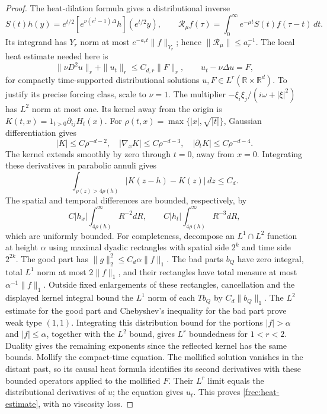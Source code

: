 \begin{proof}
The heat-dilation formula gives a distributional inverse
\[
 S(t)h(y)=e^{t/2}[e^{\nu(e^t-1)\Delta}h](e^{t/2}y),\qquad
 \mathcal R_\mu f(\tau)=\int_0^\infty e^{-\mu t}S(t)f(\tau-t)\,dt.
\]
Its integrand has \(Y_r\) norm at most
\(e^{-a_rt}\|f\|_{Y_r}\); hence \(\|\mathcal R_\mu\|\le a_r^{-1}\).
The local heat estimate needed here is
\begin{equation}\label{free:heat-estimate}
 \|\nu D^2u\|_r+\|u_t\|_r\le C_{d,r}\|F\|_r,\qquad
 u_t-\nu\Delta u=F,
\end{equation}
for compactly time-supported distributional solutions \(u,F\in
L^r(\mathbb R\times\mathbb R^d)\). To justify its precise forcing
class, scale to \(\nu=1\). The multiplier
\(-\xi_i\xi_j/(i\omega+|\xi|^2)\) has \(L^2\) norm at most one.
Its kernel away from the origin is
\(K(t,x)=1_{t>0}\partial_{ij}H_t(x)\). For
\(\rho(t,x)=\max\{|x|,\sqrt{|t|}\}\), Gaussian differentiation gives
\[
 |K|\le C\rho^{-d-2},\quad
 |\nabla_xK|\le C\rho^{-d-3},\quad
 |\partial_tK|\le C\rho^{-d-4}.
\]
The kernel extends smoothly by zero through \(t=0\), away from
\(x=0\). Integrating these derivatives in parabolic annuli gives
\[
 \int_{\rho(z)>4\rho(h)}|K(z-h)-K(z)|\,dz\le C_d.
\]
The spatial and temporal differences are bounded, respectively, by
\[
 C|h_x|\int_{4\rho(h)}^\infty R^{-2}dR,\qquad
 C|h_t|\int_{4\rho(h)}^\infty R^{-3}dR,
\]
which are uniformly bounded.
For completeness, decompose an \(L^1\cap L^2\) function at height
\(\alpha\) using maximal dyadic rectangles with spatial side \(2^k\)
and time side \(2^{2k}\). The good part has
\(\|g\|_2^2\le C_d\alpha\|f\|_1\). The bad parts \(b_Q\) have
zero integral, total \(L^1\) norm at most \(2\|f\|_1\), and their
rectangles have total measure at most \(\alpha^{-1}\|f\|_1\).
Outside fixed enlargements of these rectangles, cancellation and
the displayed kernel integral bound the \(L^1\) norm of each
\(Tb_Q\) by \(C_d\|b_Q\|_1\). The \(L^2\) estimate for the good
part and Chebyshev's inequality for the bad part prove weak type
\((1,1)\). Integrating this distribution bound for the portions
\(|f|>\alpha\) and \(|f|\le\alpha\), together with the \(L^2\)
bound, gives \(L^r\) boundedness for \(1<r<2\). Duality gives the
remaining exponents since the reflected kernel has the same bounds.
Mollify the compact-time equation. The mollified solution vanishes
in the distant past, so its causal heat formula identifies its
second derivatives with these bounded operators applied to the
mollified \(F\). Their \(L^r\) limit equals the distributional
derivatives of \(u\); the equation gives \(u_t\). This proves
\eqref{free:heat-estimate}, with no viscosity loss.


\end{proof}
